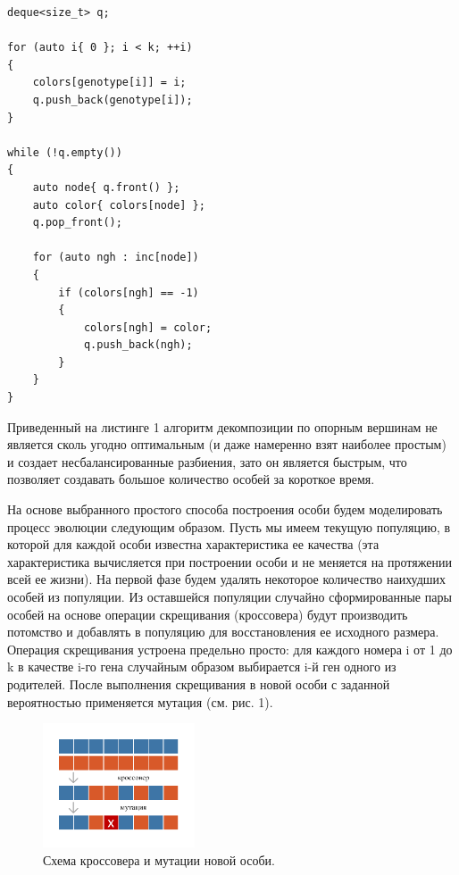 \begin{lstlisting}[caption={caption},label={label}]
deque<size_t> q;

for (auto i{ 0 }; i < k; ++i)
{
    colors[genotype[i]] = i;
    q.push_back(genotype[i]);
}

while (!q.empty())
{
    auto node{ q.front() };
    auto color{ colors[node] };
    q.pop_front();

    for (auto ngh : inc[node])
    {
        if (colors[ngh] == -1)
        {
            colors[ngh] = color;
            q.push_back(ngh);
        }
    }
}
\end{lstlisting}

Приведенный на листинге 1 алгоритм декомпозиции по опорным вершинам не является сколь угодно оптимальным (и даже намеренно взят наиболее простым) и создает несбалансированные разбиения, зато он является быстрым, что позволяет создавать большое количество особей за короткое время.

На основе выбранного простого способа построения особи будем моделировать процесс эволюции следующим образом.
Пусть мы имеем текущую популяцию, в которой для каждой особи известна характеристика ее качества (эта характеристика вычисляется при построении особи и не меняется на протяжении всей ее жизни).
На первой фазе будем удалять некоторое количество наихудших особей из популяции. Из оставшейся популяции случайно сформированные пары особей на основе операции скрещивания (кроссовера) будут производить потомство и добавлять в популяцию для восстановления ее исходного размера.
Операция скрещивания устроена предельно просто: для каждого номера i от 1 до k в качестве i-го гена случайным образом выбирается i-й ген одного из родителей. После выполнения скрещивания в новой особи с заданной вероятностью применяется мутация (см. рис. 1).

\begin{figure}[ht]
	\centering
		\includegraphics[width=0.4\textwidth]{./pics/text_2_genetic/evolution.pdf}
	\caption{Схема кроссовера и мутации новой особи.}
	\label{fig:text_2_genetic_evolution}
\end{figure}

